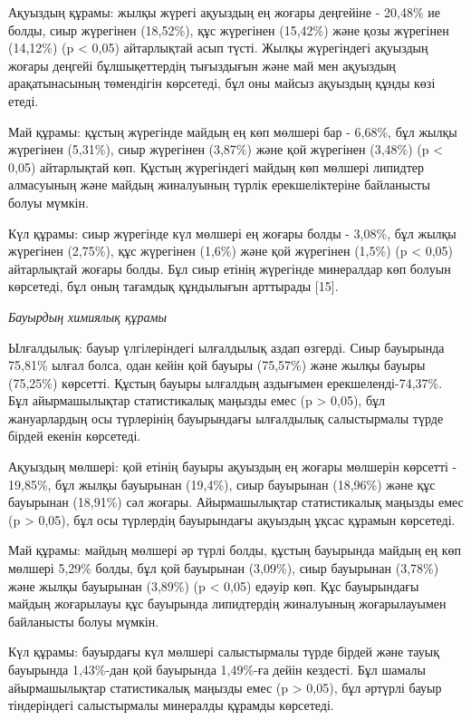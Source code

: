 \begin{multicols}{2}
Ақуыздың құрамы: жылқы жүрегі ақуыздың ең жоғары деңгейіне - 20,48\% ие
болды, сиыр жүрегінен (18,52\%), құс жүрегінен (15,42\%) және қозы
жүрегінен (14,12\%) (p \textless{} 0,05) айтарлықтай асып түсті. Жылқы
жүрегіндегі ақуыздың жоғары деңгейі бұлшықеттердің тығыздығын және май
мен ақуыздың арақатынасының төмендігін көрсетеді, бұл оны майсыз
ақуыздың құнды көзі етеді.

Май құрамы: құстың жүрегінде майдың ең көп мөлшері бар - 6,68\%, бұл
жылқы жүрегінен (5,31\%), сиыр жүрегінен (3,87\%) және қой жүрегінен
(3,48\%) (p \textless{} 0,05) айтарлықтай көп. Құстың жүрегіндегі майдың
көп мөлшері липидтер алмасуының және майдың жиналуының түрлік
ерекшеліктеріне байланысты болуы мүмкін.

Күл құрамы: сиыр жүрегінде күл мөлшері ең жоғары болды - 3,08\%, бұл
жылқы жүрегінен (2,75\%), құс жүрегінен (1,6\%) және қой жүрегінен
(1,5\%) (p \textless{} 0,05) айтарлықтай жоғары болды. Бұл сиыр етінің
жүрегінде минералдар көп болуын көрсетеді, бұл оның тағамдық құндылығын
арттырады {[}15{]}.

\emph{Бауырдың химиялық құрамы}

Ылғалдылық: бауыр үлгілеріндегі ылғалдылық аздап өзгерді. Сиыр бауырында
75,81\% ылғал болса, одан кейін қой бауыры (75,57\%) және жылқы бауыры
(75,25\%) көрсетті. Құстың бауыры ылғалдың аздығымен
ерекшеленді-74,37\%. Бұл айырмашылықтар статистикалық маңызды емес (p
\textgreater{} 0,05), бұл жануарлардың осы түрлерінің бауырындағы
ылғалдылық салыстырмалы түрде бірдей екенін көрсетеді.

Ақуыздың мөлшері: қой етінің бауыры ақуыздың ең жоғары мөлшерін көрсетті
- 19,85\%, бұл жылқы бауырынан (19,4\%), сиыр бауырынан (18,96\%) және
құс бауырынан (18,91\%) сәл жоғары. Айырмашылықтар статистикалық маңызды
емес (p \textgreater{} 0,05), бұл осы түрлердің бауырындағы ақуыздың
ұқсас құрамын көрсетеді.

Май құрамы: майдың мөлшері әр түрлі болды, құстың бауырында майдың ең
көп мөлшері 5,29\% болды, бұл қой бауырынан (3,09\%), сиыр бауырынан
(3,78\%) және жылқы бауырынан (3,89\%) (p \textless{} 0,05) едәуір көп.
Құс бауырындағы майдың жоғарылауы құс бауырында липидтердің жиналуының
жоғарылауымен байланысты болуы мүмкін.

Күл құрамы: бауырдағы күл мөлшері салыстырмалы түрде бірдей және тауық
бауырында 1,43\%-дан қой бауырында 1,49\%-ға дейін кездесті. Бұл шамалы
айырмашылықтар статистикалық маңызды емес (p \textgreater{} 0,05), бұл
әртүрлі бауыр тіндеріндегі салыстырмалы минералды құрамды көрсетеді.


\end{multicols}
